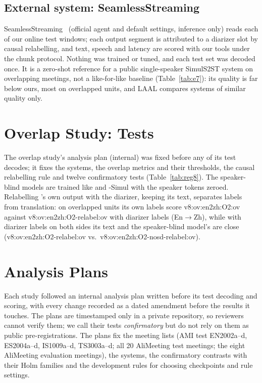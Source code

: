 \subsection{External system: SeamlessStreaming}
\label{app:e7}
SeamlessStreaming~\citep{seamless2023} (official agent and default settings, inference only) reads each of our online
test windows; each output segment is attributed to a diarizer slot by causal relabelling, and text, speech and latency
are scored with our tools under the chunk protocol. Nothing was trained or tuned, and each test set was decoded once.
It is a zero-shot reference for a public single-speaker SimulS2ST system on overlapping meetings, not a like-for-like
baseline (Table~\ref{tab:e7}): its quality is far below ours, most on overlapped units, and LAAL compares systems of
similar quality only.


\section{Overlap Study: Tests}
\label{app:v8}

The overlap study's analysis plan (internal) was fixed before any of its test decodes; it fixes the systems, the overlap
metrics and their thresholds, the causal relabelling rule and twelve confirmatory tests (Table~\ref{tab:reg8}). The
speaker-blind models are trained like \sys{} and \sys{}-Simul with the speaker tokens zeroed. Relabelling \sys{}'s own
output with the diarizer, keeping its text, separates labels from translation: on overlapped units its own labels score
\num{v8:ov:en2zh:O2:ov} against \num{v8:ov:en2zh:O2-relabel:ov} with diarizer labels (En$\rightarrow$Zh), while with
diarizer labels on both sides its text and the speaker-blind model's are close
(\num{v8:ov:en2zh:O2-relabel:ov} vs.\ \num{v8:ov:en2zh:O2-nosd-relabel:ov}).




\section{Analysis Plans}
\label{app:prereg}

Each study followed an internal analysis plan written before its test decoding and scoring, with every change recorded
as a dated amendment before the results it touches. The plans are timestamped only in a private repository, so
reviewers cannot verify them; we call their tests \emph{confirmatory} but do not rely on them as public
pre-registrations. The plans fix the meeting lists (AMI test EN2002a--d, ES2004a--d, IS1009a--d, TS3003a--d; all 20
AliMeeting test meetings; the eight AliMeeting evaluation meetings), the systems, the confirmatory contrasts with their
Holm families and the development rules for choosing checkpoints and rule settings.
